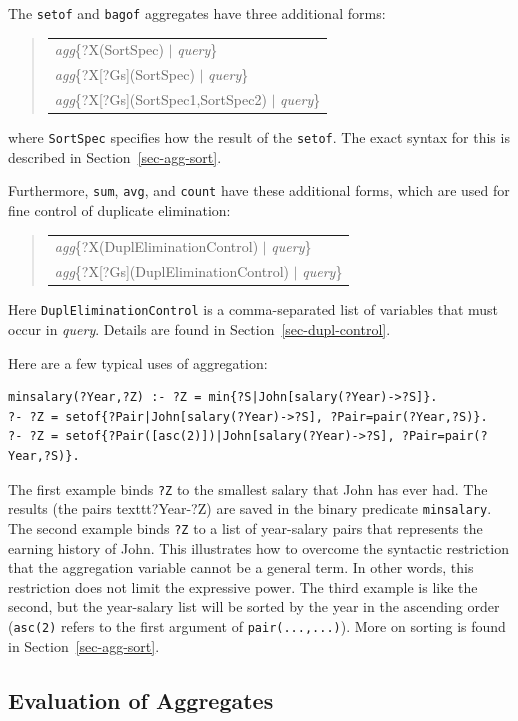 \documentclass[11pt]{article}
\newenvironment{qrules}{\begin{quote}\tt\begin{tabular}[t]{l}}%
{\end{tabular}\end{quote}}
\begin{document}
\noindent
The \texttt{setof} and \texttt{bagof} aggregates have three additional
forms:  
\begin{qrules}
\textnormal{\emph{agg}}\{?X(SortSpec) $|$ {\it query}\}\\
\textnormal{\emph{agg}}\{?X[?Gs](SortSpec) $|$ {\it query}\}\\
\textnormal{\emph{agg}}\{?X[?Gs](SortSpec1,SortSpec2) $|$ {\it query}\}
\end{qrules}
where \texttt{SortSpec} specifies how the result of the \texttt{setof}. The
exact syntax for this is described in Section~\ref{sec-agg-sort}.

Furthermore, \texttt{sum}, \texttt{avg}, and \texttt{count} have these
additional forms, which are used for fine control of duplicate elimination:
\begin{qrules}
\textnormal{\emph{agg}}\{?X(DuplEliminationControl) $|$ {\it query}\}\\
\textnormal{\emph{agg}}\{?X[?Gs](DuplEliminationControl) $|$ {\it query}\}
\end{qrules}
Here \texttt{DuplEliminationControl} is a comma-separated list of variables
that must occur in \emph{query}. Details are found in
Section~\ref{sec-dupl-control}.  

\noindent
Here are a few typical uses of aggregation:
\begin{verbatim}
minsalary(?Year,?Z) :- ?Z = min{?S|John[salary(?Year)->?S]}.
?- ?Z = setof{?Pair|John[salary(?Year)->?S], ?Pair=pair(?Year,?S)}.
?- ?Z = setof{?Pair([asc(2)])|John[salary(?Year)->?S], ?Pair=pair(?Year,?S)}.
\end{verbatim}
The first example binds \texttt{?Z} to the smallest salary that John has
ever had. The results (the pairs texttt{?Year-?Z}) are saved in the binary predicate \texttt{minsalary}.
The second example binds \texttt{?Z} to a list of year-salary   
pairs that represents the earning history of John.
This illustrates how to overcome the syntactic restriction
that the aggregation variable cannot be a general term.
In other words, this restriction does not limit the expressive power.
The third example is like the second, but the year-salary list will be
sorted by the year in the ascending order (\texttt{asc(2)} refers to the
first argument of \texttt{pair(...,...)}). More on sorting is found in
Section~\ref{sec-agg-sort}.


\subsection{Evaluation of Aggregates}\label{sec-aggr-eval}
\end{document}
